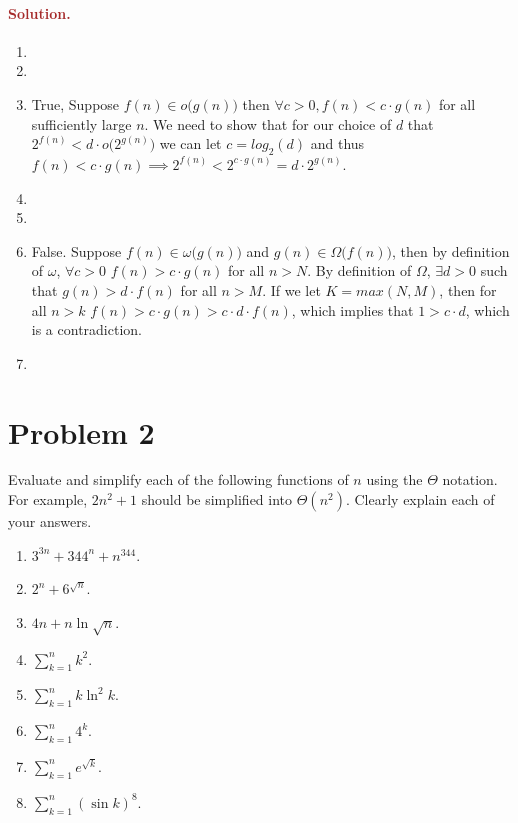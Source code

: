 \paragraph{\textcolor{brown}{Solution.}}
\begin{enumerate}
    \item 
    \item 
    \item True, Suppose $f(n) \in o\big(g(n)\big)$ then $\forall c > 0 , f(n) < c \cdot g(n)$ for all sufficiently large $n$. We need to show that for our choice of $d$ that $2^{f(n)} < d \cdot o\big(2^{g(n)}\big)$ we can let $c = log_2(d)$ and thus $f(n) < c \cdot g(n) \implies 2^{f(n)} < 2^{c \cdot g(n)} = d \cdot 2^{g(n)}$.
    \item 
    \item
    \item False. Suppose $f(n) \in \omega(g(n)\big)$ and $g(n) \in \Omega\big(f(n)\big)$, then by definition of $\omega$, $\forall c >0$ $f(n) > c \cdot g(n)$ for all $n > N$. By definition of $\Omega$, $\exists d > 0$ such that $g(n) > d \cdot f(n)$ for all $n > M$. If we let $K = max(N,M)$, then for all $n > k$ $f(n) > c \cdot g(n) > c \cdot d \cdot f(n)$, which implies that $1 > c \cdot d$, which is a contradiction.
    \item 
\end{enumerate}

\section*{Problem 2}
Evaluate and simplify each of the following functions of $n$ using the $\Theta$ notation. For example, $2n^2 + 1$ should be simplified into $\Theta(n^2)$. Clearly explain each of your answers.
\begin{enumerate}
    \item $3^{3n} + 344^n + n^{344}$.
    \item $2^{n} + 6^{\sqrt{n}}$.
    \item $4n + n \ln \sqrt{n}$.
    \item $\sum_{k = 1}^{n} k^2$.
    \item $\sum_{k = 1}^{n} k \ln^2 k$.
    \item $\sum_{k = 1}^{n} 4^k$.
    \item $\sum_{k = 1}^{n} e^{\sqrt{k}}$.
    \item $\sum_{k = 1}^{n} (\sin k)^8$.
\end{enumerate}

